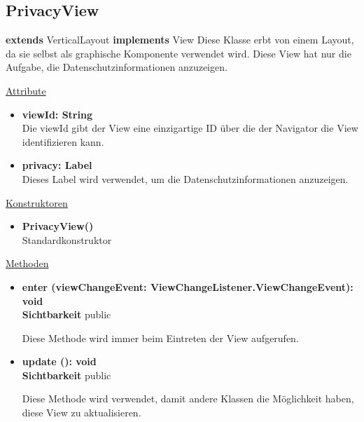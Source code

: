 \newpage
\subsection{PrivacyView}\label{PrivacyView}
\textbf{extends}  VerticalLayout \newline
\textbf{implements} View \newline
Diese Klasse erbt von einem Layout, da sie selbst als graphische Komponente verwendet wird. Diese View hat nur die Aufgabe, die Datenschutzinformationen anzuzeigen.
\newline

\underline{Attribute}
\begin{itemize}
\itemsep0pt
\item \textbf{viewId: String} \hfill\\ 
Die viewId gibt der View eine einzigartige ID über die der Navigator die View identifizieren kann.

\item \textbf{privacy: Label} \hfill\\ 
Dieses Label wird verwendet, um die Datenschutzinformationen anzuzeigen.

\end{itemize}

\underline{Konstruktoren}
\begin{itemize}
\itemsep0pt
\item \textbf{PrivacyView()} \hfill\\
Standardkonstruktor
\end{itemize}

\underline{Methoden}
\begin{itemize}
\itemsep0pt
\item \textbf{enter (viewChangeEvent: ViewChangeListener.ViewChangeEvent): void}\hfill\\
\textbf{Sichtbarkeit} public

Diese Methode wird immer beim Eintreten der View aufgerufen.

\item \textbf{update (): void}\hfill\\
\textbf{Sichtbarkeit} public

Diese Methode wird verwendet, damit andere Klassen die Möglichkeit haben, diese View zu aktualisieren.

\end{itemize}
